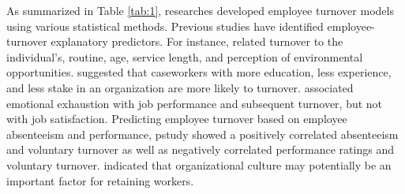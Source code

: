As summarized in Table \ref{tab:1}, researches developed employee turnover models using various statistical methods. Previous studies have identified employee-turnover explanatory predictors. For instance, \citet{bluedorn1982} related turnover to the individual's, routine, age, service length, and perception of environmental opportunities. \citet{balfour1993} suggested that caseworkers with more education, less experience, and less stake in an organization are more likely to turnover. \citet{wright1998} associated emotional exhaustion with job performance and subsequent turnover, but not with job satisfaction. Predicting employee turnover based on employee absenteeism and performance, \citet{morrow1999} pstudy showed a positively correlated absenteeism and voluntary turnover as well as negatively correlated performance ratings and voluntary turnover. \citet{thaden2010} indicated that organizational culture may potentially be an important factor for retaining workers.   
